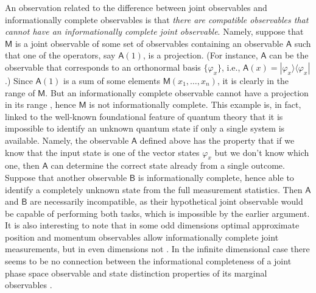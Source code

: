 \documentclass[12pt]{iopart}
\theoremstyle{definition}
\newcommand{\kb}[2]{|#1\rangle\langle#2|} %
\newcommand{\Ao}{\mathsf{A}}%
\newcommand{\Bo}{\mathsf{B}}%
\newcommand{\Mo}{\mathsf{M}}%
\begin{document}
An observation related to the difference between joint observables and informationally complete observables is that \emph{there are compatible observables that cannot have an informationally complete joint observable}.
Namely, suppose that $\Mo$ is a joint observable of some set of observables containing an observable $\Ao$ such that one of the operators, say $\Ao(1)$, is a projection. (For instance, $\Ao$ can be the observable that corresponds to an orthonormal basis $\{\varphi_x\}$, i.e., $\Ao(x)=\kb{\varphi_x}{\varphi_x}$.)
Since $\Ao(1)$ is a sum of some elements $\Mo(x_1,\ldots,x_n)$, it is clearly in the range of $\Mo$.
But an informationally complete observable cannot have a projection in its range \cite{BuCaLa95}, hence $\Mo$ is not informationally complete.
This example is, in fact, linked to the well-known foundational feature of quantum theory that it is impossible to identify an unknown quantum state if only a single system is available.
Namely, the observable $\Ao$ defined above has the property that if we know that the input state is one of the vector states $\varphi_x$ but we don't know which one, then $\Ao$ can determine the correct state already from a single outcome. 
Suppose that another observable $\Bo$ is informationally complete, hence able to identify a completely unknown state from the full measurement statistics. 
Then $\Ao$ and $\Bo$ are necessarily incompatible, as their hypothetical joint observable would be capable of performing both tasks, which is impossible by the earlier argument. 
It is also interesting to note that in some odd dimensions optimal approximate position and momentum observables allow informationally complete joint measurements, but in even dimensions not \cite{CaHeTo12}. 
In the infinite dimensional case there seems to be no connection between the informational completeness of a joint phase space observable and state distinction properties of its marginal observables \cite{Schultz12}. 
\end{document}
